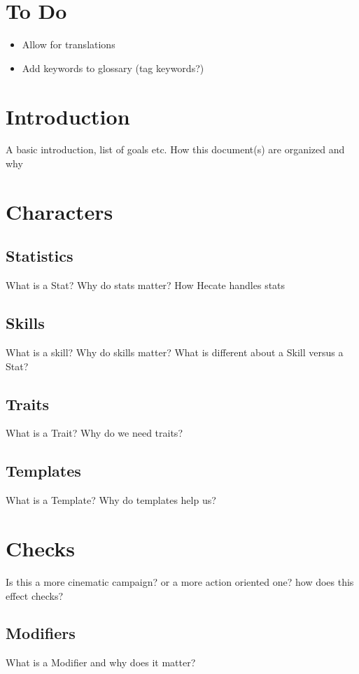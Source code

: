 \documentclass{article}
\begin{document}
\section{To Do}
\begin{itemize}
	\item Allow for translations
	\item Add keywords to glossary (tag keywords?)
\end{itemize}

\section{Introduction}
A basic introduction, list of goals etc. How this document(s) are organized and why


\section{Characters}

\subsection{Statistics}
What is a Stat? Why do stats matter? How Hecate handles stats

\subsection{Skills}
What is a skill? Why do skills matter? What is different about a Skill versus a Stat?

\subsection{Traits}
What is a Trait? Why do we need traits?

\subsection{Templates}
What is a Template? Why do templates help us?


\section{Checks}
Is this a more cinematic campaign? or a more action oriented one? how does this effect checks?

\subsection{Modifiers}
What is a Modifier and why does it matter?
\end{document}
